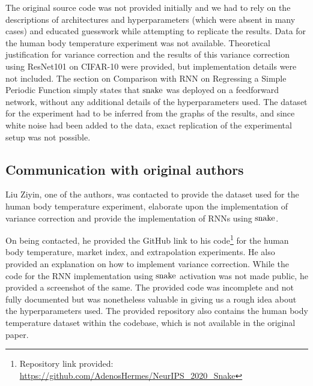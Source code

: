 The original source code was not provided initially and we had to rely on the descriptions of architectures and hyperparameters (which were absent in many cases) and educated guesswork while attempting to replicate the results. 
Data for the human body temperature experiment was not available. 
Theoretical justification for variance correction and the results of this variance correction using ResNet101 on CIFAR-10 were provided, but implementation details were not included. 
The section on Comparison with RNN on Regressing a Simple Periodic Function simply states that $ \operatorname{snake} $ was deployed on a feedforward network, without any additional details of the hyperparameters used. The dataset for the experiment had to be inferred from the graphs of the results, and since white noise had been added to the data, exact replication of the experimental setup was not possible.

\subsection{Communication with original authors}

Liu Ziyin, one of the authors, was contacted to provide the dataset used for the human body temperature experiment, elaborate upon the implementation of variance correction and provide the implementation of RNNs using $ \operatorname{snake} $.

On being contacted, he provided the GitHub link to his code\footnote{Repository link provided: \url{https://github.com/AdenosHermes/NeurIPS_2020_Snake}} for the human body temperature, market index, and extrapolation experiments. He also provided an explanation on how to implement variance correction. While the code for the RNN implementation using $ \operatorname{snake} $ activation was not made public, he provided a screenshot of the same. The provided code was incomplete and not fully documented but was nonetheless valuable in giving us a rough idea about the hyperparameters used. The provided repository also contains the human body temperature dataset within the codebase, which is not available in the original paper.